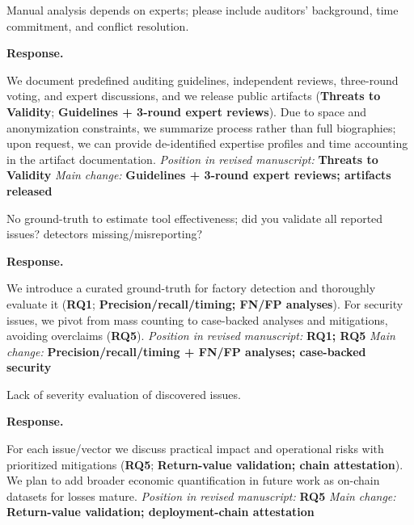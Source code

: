 \documentclass[acmsmall]{acmart}
\begin{document}
	\begin{tcolorbox}
		[commentbox,title=Reviewer \#4 -- Comment 1] Manual analysis depends on experts; please
		include auditors' background, time commitment, and conflict resolution.
	\end{tcolorbox}

	\noindent
	\textbf{Response.}

	We document predefined auditing guidelines, independent reviews, three-round voting, and expert
	discussions, and we release public artifacts ({\textbf{Threats to Validity}}; {\textbf{Guidelines + 3-round expert reviews}}).
	Due to space and anonymization constraints, we summarize process rather than full biographies; upon
	request, we can provide de-identified expertise profiles and time accounting in the artifact
documentation.
\noindent\textit{Position in revised manuscript:} {\color{red}\textbf{Threats to Validity}}
\noindent\textit{Main change:} {\color{blue}\textbf{Guidelines + 3-round expert reviews; artifacts released}}

	\begin{tcolorbox}
		[commentbox,title=Reviewer \#4 -- Comment 2] No ground-truth to estimate tool effectiveness;
		did you validate all reported issues? detectors missing/misreporting?
	\end{tcolorbox}

	\noindent
	\textbf{Response.}

	We introduce a curated ground-truth for factory detection and thoroughly evaluate it ({\textbf{RQ1}};
	{\textbf{Precision/recall/timing; FN/FP analyses}}). For security issues, we pivot from mass counting
		to case-backed analyses and mitigations, avoiding overclaims ({\textbf{RQ5}}).
		\noindent\textit{Position in revised manuscript:} {\color{red}\textbf{RQ1; RQ5}}
		\noindent\textit{Main change:} {\color{blue}\textbf{Precision/recall/timing + FN/FP analyses; case-backed security}}

	\begin{tcolorbox}
		[commentbox,title=Reviewer \#4 -- Comment 3] Lack of severity evaluation of discovered issues.
	\end{tcolorbox}

	\noindent
	\textbf{Response.}

	For each issue/vector we discuss practical impact and operational risks with prioritized
	mitigations ({\textbf{RQ5}}; {\textbf{Return-value validation; chain attestation}}). We plan to
		add broader economic quantification in future work as on-chain datasets for losses mature.
		\noindent\textit{Position in revised manuscript:} {\color{red}\textbf{RQ5}}
		\noindent\textit{Main change:} {\color{blue}\textbf{Return-value validation; deployment-chain attestation}}
\end{document}
